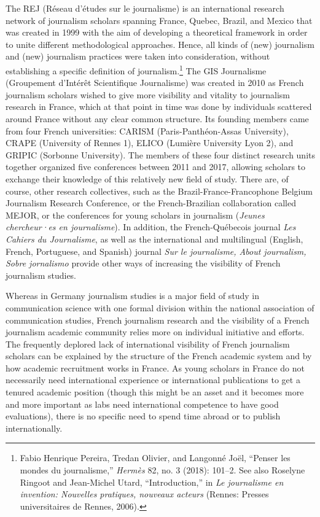 \documentclass{tufte-handout}
\begin{document}
The REJ (Réseau d'études sur le journalisme) is an international
research network of journalism scholars spanning France, Quebec, Brazil,
and Mexico that was created in 1999 with the aim of developing a
theoretical framework in order to unite different methodological
approaches. Hence, all kinds of (new) journalism and (new) journalism
practices were taken into consideration, without establishing a specific
definition of journalism.\footnote{Fabio Henrique Pereira, Tredan
  Olivier, and Langonné Joël, ``Penser les mondes du journalisme,''
  \emph{Hermès} 82, no. 3 (2018): 101--2. See also Roselyne Ringoot and
  Jean-Michel Utard, ``Introduction,'' in \emph{Le journalisme en
  invention: Nouvelles pratiques, nouveaux acteurs} (Rennes: Presses
  universitaires de Rennes, 2006).} The GIS Journalisme (Groupement
d'Intérêt Scientifique Journalisme) was created in 2010 as French
journalism scholars wished to give more visibility and vitality to
journalism research in France, which at that point in time was done by
individuals scattered around France without any clear common structure.
Its founding members came from four French universities: CARISM
(Paris-Panthéon-Assas University), CRAPE (University of Rennes 1), ELICO
(Lumière University Lyon 2), and GRIPIC (Sorbonne University). The
members of these four distinct research units together organized five
conferences between 2011 and 2017, allowing scholars to exchange their
knowledge of this relatively new field of study. There are, of course,
other research collectives, such as the Brazil-France-Francophone
Belgium Journalism Research Conference, or the French-Brazilian
collaboration called MEJOR, or the conferences for young scholars in
journalism (\emph{Jeunes chercheur·es en journalisme}). In addition, the
French-Québecois journal \emph{Les Cahiers du Journalisme}, as well as
the international and multilingual (English, French, Portuguese, and
Spanish) journal \emph{Sur le journalisme, About journalism, Sobre
jornalismo} provide other ways of increasing the visibility of French
journalism studies.

Whereas in Germany journalism studies is a major field of study in
communication science with one formal division within the national
association of communication studies, French journalism research and the
visibility of a French journalism academic community relies more on
individual initiative and efforts. The frequently deplored lack of
international visibility of French journalism scholars can be explained
by the structure of the French academic system and by how academic
recruitment works in France. As young scholars in France do not
necessarily need international experience or international publications
to get a tenured academic position (though this might be an asset and it
becomes more and more important as labs need international competence to
have good evaluations), there is no specific need to spend time abroad
or to publish internationally.
\end{document}
